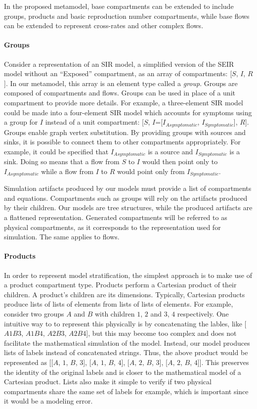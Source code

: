 In the proposed metamodel, base compartments can be extended to include groups, products and basic reproduction number compartments, while base flows can be extended to represent cross-rates and other complex flows.

\paragraph{Groups}

Consider a representation of an SIR model, a simplified version of the SEIR model without an ``Exposed'' compartment, as an array of compartments: [$S$, $I$, $R$]. In our metamodel, this array is an element type called a \textit{group}. Groups are composed of compartments and flows. Groups can be used in place of a unit compartment to provide more details. For example, a three-element SIR model could be made into a four-element SIR model  which accounts for symptoms using a group for $I$ instead of a unit compartment: [$S$, $I$=[$I_{Asymptomatic}$, $I_{Symptomatic}$], $R$]. Groups enable graph vertex substitution\cite{PREVITE_1998}. By providing groups with sources and sinks, it is possible to connect them to other compartments appropriately. For example, it could be specified that $I_{Asymptomatic}$ is a source and $I_{Symptomatic}$ is a sink. Doing so means that a flow from $S$ to $I$ would then point only to $I_{Asymptomatic}$ while a flow from $I$ to $R$ would point only from $I_{Symptomatic}$.

Simulation artifacts produced by our models must provide a list of compartments and equations. Compartments such as groups will rely on the artifacts produced by their children. Our models are tree structures, while the produced artifacts are a flattened representation. Generated compartments will be referred to as physical compartments, as it corresponds to the representation used for simulation.
The same applies to flows.

\paragraph{Products}
In order to represent model stratification, the simplest approach is to make use of a product compartment type. Products perform a Cartesian product of their children. A product's children are its dimensions. Typically, Cartesian products produce lists of lists of elements from lists of lists of elements. For example, consider two groups $A$ and $B$ with children $1$, $2$ and $3$, $4$ respectively. One intuitive way to to represent this physically is by concatenating the lables, like [$A1B3$, $A1B4$, $A2B3$, $A2B4$], but this may become too complex and does not facilitate the mathematical simulation of the model. Instead, our model produces lists of labels instead of concatenated strings. Thus, the above product would be represented as [[$A$, $1$, $B$, $3$], [$A$, $1$, $B$, $4$], [$A$, $2$, $B$, $3$], [$A$, $2$, $B$, $4$]]. This preserves the identity of the original labels and is closer to the mathematical model of a Cartesian product. Lists also make it simple to verify if two physical compartments share the same set of labels for example, which is important since it would be a modeling error.

